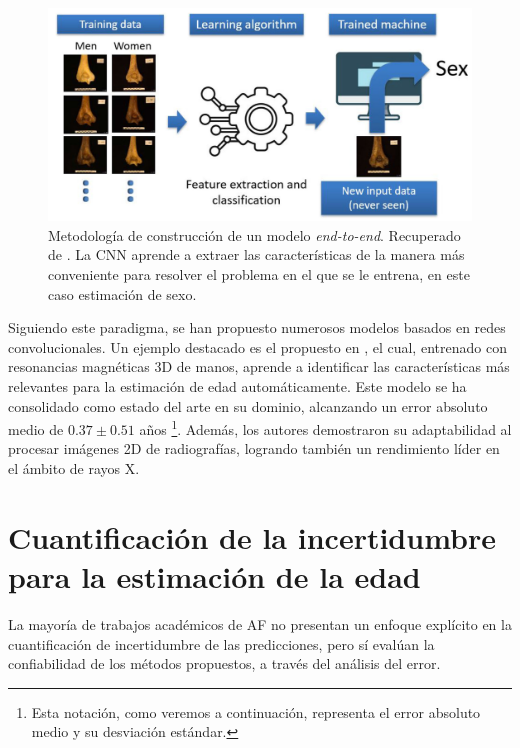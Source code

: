 \begin{figure}[htbp]
    \centering
    \includegraphics[width=\textwidth]{capitulos/cap_03/imagenes/end-to-end_learning.png}
    \caption[
        Metodología de construcción de un modelo \textit{end-to-end}.
    ]{
        Metodología de construcción de un modelo \textit{end-to-end}. 
        Recuperado de \cite{venema2022}.
        La CNN aprende a extraer las características de la manera más conveniente para resolver el problema en el que se le entrena, en este caso estimación de sexo.
    }
    \label{fig:end-to-end_model}
\end{figure}

Siguiendo este paradigma, se han propuesto numerosos modelos basados en redes convolucionales. Un ejemplo destacado es el propuesto en \cite{stern2019}, el cual, entrenado con resonancias magnéticas 3D de manos, aprende a identificar las características más relevantes para la estimación de edad automáticamente. Este modelo se ha consolidado como estado del arte en su dominio, alcanzando un error absoluto medio de $0.37 \pm 0.51$ años%
\footnote{
    Esta notación, como veremos a continuación, representa el error absoluto medio y su desviación estándar.
}. 
Además, los autores demostraron su adaptabilidad al procesar imágenes 2D de radiografías, logrando también un rendimiento líder en el ámbito de rayos X.


\section{Cuantificación de la incertidumbre para la estimación de la edad}

La mayoría de trabajos académicos de AF no presentan un enfoque explícito en la cuantificación de incertidumbre de las predicciones, pero sí evalúan la confiabilidad de los métodos propuestos, a través del análisis del error. 

